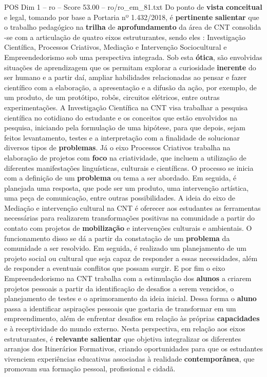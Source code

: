 \begin{textsample}{POS Dim 1 – ro – Score 53.00 – ro/ro\_em\_81.txt}
Do ponto de \textbf{vista} \textbf{conceitual} e legal, tomando por base a Portaria nº 1.432/2018, é \textbf{pertinente} \textbf{salientar} que o trabalho pedagógico na \textbf{trilha} de \textbf{aprofundamento} da área de CNT consolida -se com a articulação de quatro eixos estruturantes, sendo eles : Investigação Científica, Processos Criativos, Mediação e Intervenção Sociocultural e Empreendedorismo sob uma perspectiva integrada.
Sob esta \textbf{ótica}, são envolvidas situações de aprendizagem que os permitam explorar a curiosidade \textbf{inerente} do ser humano e a partir daí, ampliar habilidades relacionadas ao pensar e fazer científico com a elaboração, a apresentação e a difusão da ação, por exemplo, de um produto, de um protótipo, robôs, circuitos elétricos, entre outras experimentações.
A Investigação Científica na CNT visa trabalhar a pesquisa científica no cotidiano do estudante e os conceitos que estão envolvidos na pesquisa, iniciando pela formulação de uma hipótese, para que depois, sejam feitos levantamento, testes e a interpretação com a finalidade de solucionar diversos tipos de \textbf{problemas}.
Já o eixo Processos Criativos trabalha na elaboração de projetos com \textbf{foco} na criatividade, que incluem a utilização de diferentes manifestações linguísticas, culturais e científicas.
O processo se inicia com a definição de um \textbf{problema} ou tema a ser abordado.
Em seguida, é planejada uma resposta, que pode ser um produto, uma intervenção artística, uma peça de comunicação, entre outras possibilidades.
A ideia do eixo de Mediação e intervenção cultural na CNT é oferecer aos estudantes as ferramentas necessárias para realizarem transformações positivas na comunidade a partir do contato com projetos de \textbf{mobilização} e intervenções culturais e ambientais.
O funcionamento disso se dá a partir da constatação de um \textbf{problema} da comunidade a ser resolvido.
Em seguida, é realizado um planejamento de um projeto social ou cultural que seja capaz de responder a essas necessidades, além de responder a eventuais conflitos que possam surgir.
E por fim o eixo Empreendedorismo na CNT trabalha com a estimulação dos \textbf{alunos} a criarem projetos pessoais a partir da identificação de desafios a serem vencidos, o planejamento de testes e o aprimoramento da ideia inicial.
Dessa forma o \textbf{aluno} passa a identificar aspirações pessoais que gostaria de transformar em um empreendimento, além de enfrentar desafios em relação às próprias \textbf{capacidades} e à receptividade do mundo externo.
Nesta perspectiva, em relação aos eixos estruturantes, é \textbf{relevante} \textbf{salientar} que objetiva integralizar os diferentes arranjos dos Itinerários Formativos, criando oportunidades para que os estudantes vivenciem experiências educativas associadas à realidade \textbf{contemporânea}, que promovam sua formação pessoal, profissional e cidadã.

\end{textsample}
